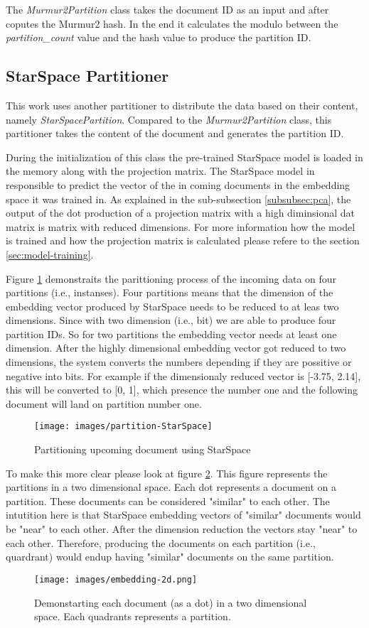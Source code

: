 The \emph{Murmur2Partition} class takes the document ID as an input and after coputes the Murmur2 hash. In the end it calculates the modulo between the \emph{partition\_count} value and the hash value to produce the partition ID. 

\subsection{StarSpace Partitioner}
\label{subsec:partitioning-star-space}
This work uses another partitioner to distribute the data based on their content, namely \emph{StarSpacePartition}. Compared to the \emph{Murmur2Partition} class, this partitioner takes the content of the document and generates the partition ID.


During the initialization of this class the pre-trained StarSpace model is loaded in the memory along with the projection matrix. The StarSpace model in responsible to predict the vector of the in coming documents in the embedding space it was trained in. As explained in the sub-subsection \ref{subsubsec:pca}, the output of the dot production of a projection matrix with a high diminsional dat matrix is matrix with reduced dimensions. For more information how the model is trained and how the projection matrix is calculated please refere to the section \ref{sec:model-training}.


Figure \ref{fig:star-space-partitioning-process} demonstraits the parittioning process of the incoming data on four partitions (i.e., instanses). Four partitions means that the dimension of the embedding vector produced by StarSpace needs to be reduced to at leas two dimensions. Since with two dimension (i.e., bit) we are able to produce four partition IDs. So for two partitions the embedding vector needs at least one dimension. After the highly dimensional embedding vector got reduced to two dimensions, the system converts the numbers depending if they are possitive or negative into bits. For example if the dimensionaly reduced vector is [-3.75, 2.14], this will be converted to [0, 1], which presence the number one and the following document will land on partition number one.


\begin{figure}[!h]
	\centering
	\texttt{[image: images/partition-StarSpace]}
	\caption{Partitioning upcoming document using StarSpace}
	\label{fig:star-space-partitioning-process}
\end{figure}


To make this more clear please look at figure \ref{fig:embedding-space}. This figure represents the partitions in a two dimensional space. Each dot represents a document on a partition. These documents can be considered "similar" to each other. The intutition here is that StarSpace embedding vectors of "similar" documents would be "near" to each other. After the dimension reduction the vectors stay "near" to each other. Therefore, producing the documents on each partition (i.e., quardrant) would endup having "similar" documents on the same partition.


\begin{figure}[!h]
	\centering
	\texttt{[image: images/embedding-2d.png]}
	\caption{Demonstarting each document (as a dot) in a two dimensional space. Each quadrants represents a partition.}
	\label{fig:embedding-space}
\end{figure}

